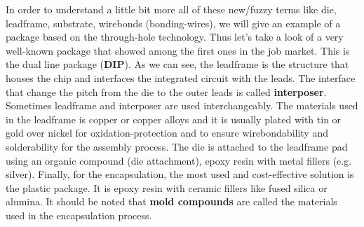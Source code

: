 \documentclass[final]{cubedoc}
\begin{document}
	In order to understand a little bit more all of these new/fuzzy terms like die, leadframe, substrate, wirebonds (bonding-wires), we will give an example of a package based on the through-hole technology. Thus let's take a look of a very well-known package that showed among the first ones in the job market. This is the dual line package (\textbf{DIP}). As we can see, the leadframe is the structure that houses the chip and interfaces the integrated circuit with the leads. The interface that change the pitch from the die to the outer leads is called \textbf{interposer}. Sometimes leadframe and interposer are used interchangeably. The materials used in the leadframe is copper or copper alloys and it is usually plated with tin or gold over nickel for oxidation-protection and to ensure wirebondability and solderability for the assembly process. The die is attached to the leadframe pad using an organic compound (die attachment), epoxy resin with metal fillers (e.g. silver). Finally, for the encapsulation, the most used and cost-effective solution is the plastic package. It is epoxy resin with ceramic fillers like fused silica or alumina. It should be noted that \textbf{mold compounds} are called the materials used in the encapsulation process. 
	
	
\end{document}
